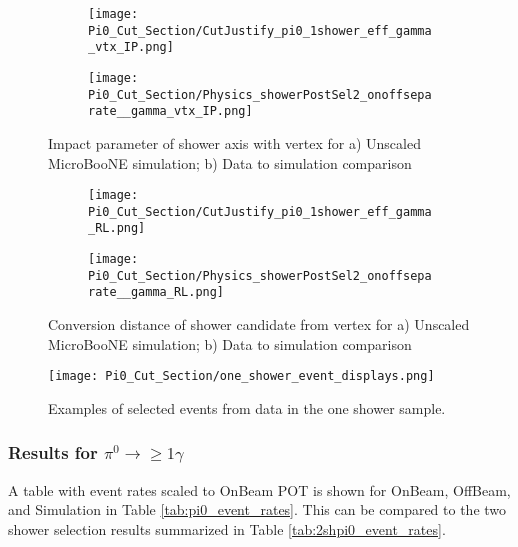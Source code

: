 \begin{figure}[H]
\centering
  \begin{subfigure}[t]{0.35\textwidth}
    \centering
\texttt{[image: Pi0\_Cut\_Section/CutJustify\_pi0\_1shower\_eff\_gamma\_vtx\_IP.png]}
  \caption{ }
  \end{subfigure} 
  \hspace{30mm}
  \begin{subfigure}[t]{0.35\textwidth}
    \centering
\texttt{[image: Pi0\_Cut\_Section/Physics\_showerPostSel2\_onoffseparate\_\_gamma\_vtx\_IP.png]}
  \caption{ }
  \end{subfigure} 
\caption{ Impact parameter of shower axis with vertex for a) Unscaled MicroBooNE simulation; b) Data to simulation comparison }
\label{fig:cutjust_pi0_1shower_IP}
\end{figure}

\begin{figure}[H]
\centering
  \begin{subfigure}[t]{0.35\textwidth}
    \centering
\texttt{[image: Pi0\_Cut\_Section/CutJustify\_pi0\_1shower\_eff\_gamma\_RL.png]}
  \caption{ }
  \end{subfigure} 
  \hspace{30mm}
  \begin{subfigure}[t]{0.35\textwidth}
    \centering
\texttt{[image: Pi0\_Cut\_Section/Physics\_showerPostSel2\_onoffseparate\_\_gamma\_RL.png]}
  \caption{ }
  \end{subfigure} 
\caption{ Conversion distance of shower candidate from vertex for a) Unscaled MicroBooNE simulation; b) Data to simulation comparison }
\label{fig:cutjust_pi0_1shower_RL}
\end{figure}

\begin{figure}[H]
    \centering
\texttt{[image: Pi0\_Cut\_Section/one\_shower\_event\_displays.png]}
\caption{ Examples of selected events from data in the one shower sample.}
\label{fig:one_shower_event_displays}
\end{figure}



\subsubsection{Results for $\pi^0\rightarrow \geq 1\gamma$}
\par A table with event rates scaled to OnBeam POT is shown for OnBeam, OffBeam, and Simulation in Table \ref{tab:pi0_event_rates}. This can be compared to the two shower selection results summarized in Table \ref{tab:2shpi0_event_rates}.  

